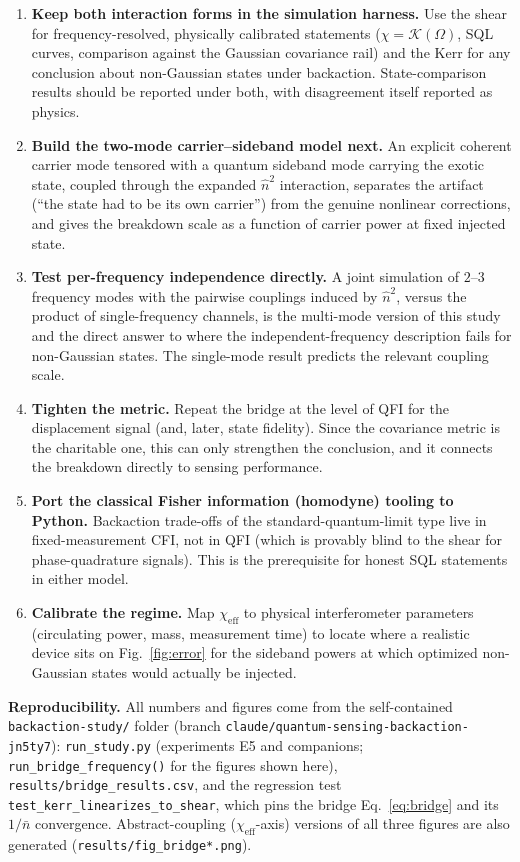 \documentclass[11pt]{article}
\newcommand{\nbar}{\bar{n}}
\newcommand{\chieff}{\chi_{\mathrm{eff}}}
\begin{document}
\begin{enumerate}
\item \textbf{Keep both interaction forms in the simulation harness.} Use
the shear for frequency-resolved, physically calibrated statements
($\chi = \mathcal{K}(\Omega)$, SQL curves, comparison against the Gaussian
covariance rail) and the Kerr for any conclusion about non-Gaussian states
under backaction. State-comparison results should be reported under both,
with disagreement itself reported as physics.

\item \textbf{Build the two-mode carrier--sideband model next.} An
explicit coherent carrier mode tensored with a quantum sideband mode
carrying the exotic state, coupled through the expanded $\hat n^{2}$
interaction, separates the artifact (``the state had to be its own
carrier'') from the genuine nonlinear corrections, and gives the breakdown
scale as a function of carrier power at fixed injected state.

\item \textbf{Test per-frequency independence directly.} A joint
simulation of $2$--$3$ frequency modes with the pairwise couplings induced
by $\hat n^{2}$, versus the product of single-frequency channels, is the
multi-mode version of this study and the direct answer to where the
independent-frequency description fails for non-Gaussian states. The
single-mode result predicts the relevant coupling scale.

\item \textbf{Tighten the metric.} Repeat the bridge at the level of QFI
for the displacement signal (and, later, state fidelity). Since the
covariance metric is the charitable one, this can only strengthen the
conclusion, and it connects the breakdown directly to sensing performance.

\item \textbf{Port the classical Fisher information (homodyne) tooling to
Python.} Backaction trade-offs of the standard-quantum-limit type live in
fixed-measurement CFI, not in QFI (which is provably blind to the shear
for phase-quadrature signals). This is the prerequisite for honest SQL
statements in either model.

\item \textbf{Calibrate the regime.} Map $\chieff$ to physical
interferometer parameters (circulating power, mass, measurement time) to
locate where a realistic device sits on Fig.~\ref{fig:error} for the
sideband powers at which optimized non-Gaussian states would actually be
injected.
\end{enumerate}

\vspace{1em}
\noindent\textbf{Reproducibility.} All numbers and figures come from the
self-contained \texttt{backaction-study/} folder (branch
\texttt{claude/quantum-sensing-backaction-jn5ty7}):
\texttt{run\_study.py} (experiments E5 and companions;
\texttt{run\_bridge\_frequency()} for the figures shown here),
\texttt{results/bridge\_results.csv},
and the regression test \texttt{test\_kerr\_linearizes\_to\_shear}, which
pins the bridge Eq.~\eqref{eq:bridge} and its $1/\nbar$ convergence.
Abstract-coupling ($\chieff$-axis) versions of all three figures are also
generated (\texttt{results/fig\_bridge*.png}).
\end{document}
